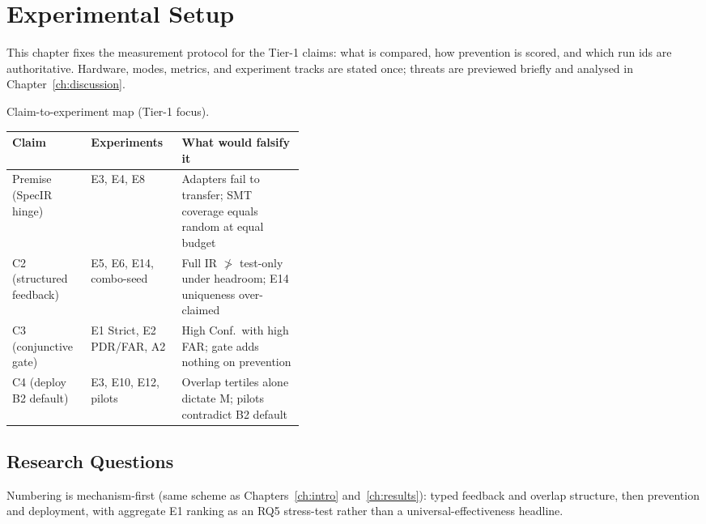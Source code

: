 
\chapter{Experimental Setup}
\label{ch:experiments}

This chapter fixes the measurement protocol for the Tier-1 claims:
what is compared, how prevention is scored, and which run ids are
authoritative.
Hardware, modes, metrics, and experiment tracks are stated once;
threats are previewed briefly and analysed in Chapter~\ref{ch:discussion}.



\begin{inlinetable}{Claim-to-experiment map (Tier-1 focus).}
  \label{tab:claim-map}
  \footnotesize
  \begin{tabular}{llp{0.42\linewidth}}
    \toprule
    Claim & Experiments & What would falsify it \\
    \midrule
    Premise (SpecIR hinge) & E3, E4, E8 & Adapters fail to transfer; SMT
      coverage equals random at equal budget \\
    C2 (structured feedback) & E5, E6, E14, combo-seed & Full IR $\not>$
      test-only under headroom; E14 uniqueness over-claimed \\
    C3 (conjunctive gate) & E1 Strict, E2 PDR/FAR, A2 & High Conf.\ with
      high FAR; gate adds nothing on prevention \\
    C4 (deploy B2 default) & E3, E10, E12, pilots & Overlap tertiles alone
      dictate M; pilots contradict B2 default \\
    \bottomrule
  \end{tabular}
\end{inlinetable}

\section{Research Questions}
\label{sec:exp:rq}

Numbering is mechanism-first (same scheme as Chapters~\ref{ch:intro}
and~\ref{ch:results}): typed feedback and overlap structure, then
prevention and deployment, with aggregate E1 ranking as an RQ5
stress-test rather than a universal-effectiveness headline.

